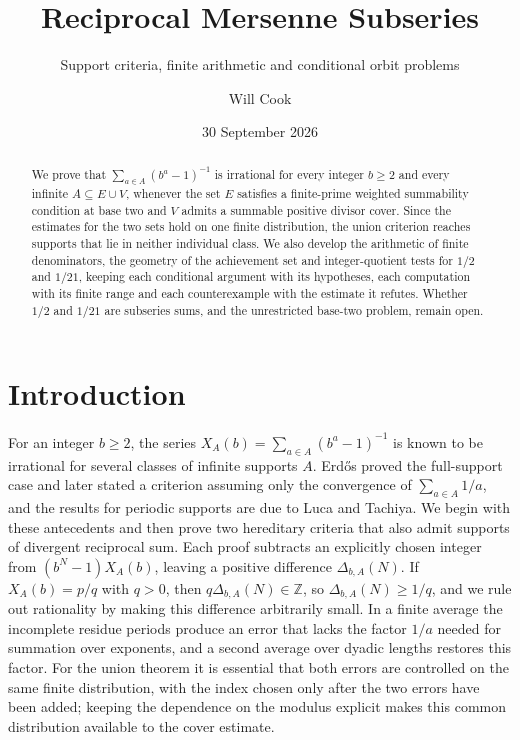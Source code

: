 \documentclass[11pt]{article}
\title{Reciprocal Mersenne Subseries}
\subtitle{Support criteria, finite arithmetic and conditional orbit problems}
\author{Will Cook}
\date{30 September 2026}
\theoremstyle{plain}
\theoremstyle{definition}
\theoremstyle{remark}
\begin{document}
\maketitle

\paperprovenance

\begin{abstract}
We prove that $\sum_{a\in A}(b^a-1)^{-1}$ is irrational for every
integer $b\ge2$ and every infinite $A\subseteq E\cup V$, whenever the
set $E$ satisfies a finite-prime weighted summability condition at base
two and $V$ admits a summable positive divisor cover. Since the
estimates for the two sets hold on one finite distribution, the union
criterion reaches supports that lie in neither individual class. We
also develop the arithmetic of finite denominators, the geometry of the
achievement set and integer-quotient tests for $1/2$ and $1/21$, keeping
each conditional argument with its hypotheses, each computation with
its finite range and each counterexample with the estimate it refutes.
Whether $1/2$ and $1/21$ are subseries sums, and the unrestricted
base-two problem, remain open.
\end{abstract}

\section*{Introduction}
For an integer $b\ge2$, the series $X_A(b)=\sum_{a\in A}(b^a-1)^{-1}$
is known to be irrational for several classes of infinite supports $A$.
Erd\H{o}s proved the full-support case and later stated a criterion
assuming only the convergence of $\sum_{a\in A}1/a$, and the results
for periodic supports are due to Luca and Tachiya. We begin with these
antecedents and then prove two hereditary criteria that also admit
supports of divergent reciprocal sum. Each proof subtracts an
explicitly chosen integer from $(b^N-1)X_A(b)$, leaving a positive
difference $\Delta_{b,A}(N)$. If $X_A(b)=p/q$ with $q>0$, then
$q\Delta_{b,A}(N)\in\mathbb Z$, so $\Delta_{b,A}(N)\ge1/q$, and we rule
out rationality by making this difference arbitrarily small. In a
finite average the incomplete residue periods produce an error that
lacks the factor $1/a$ needed for summation over exponents, and a
second average over dyadic lengths restores this factor. For the union
theorem it is essential that both errors are controlled on the same
finite distribution, with the index chosen only after the two errors
have been added; keeping the dependence on the modulus explicit makes
this common distribution available to the cover estimate.
\end{document}
